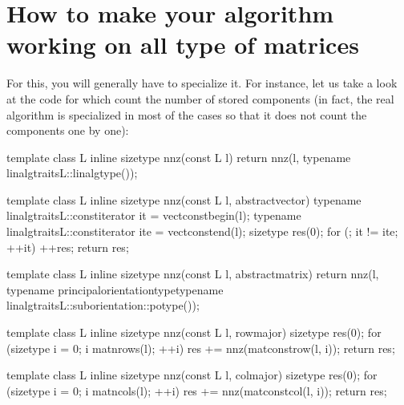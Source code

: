 \documentclass[a4paper,11pt,english]{sphinxmanual}
\begin{document}
\section{How to make your algorithm working on all type of matrices}
\label{\detokenize{gmm/inside:how-to-make-your-algorithm-working-on-all-type-of-matrices}}
For this, you will generally have to specialize it. For instance, let us take a look at the code for  which count the number of stored components (in fact, the real  algorithm is specialized in most of the cases so that it does not count the components one by one):

\begin{sphinxVerbatim}[commandchars=\\\{\}]
template \PYGZlt{}class L\PYGZgt{} inline size\PYGZus{}type nnz(const L\PYGZam{} l) \PYGZob{}
  return nnz(l, typename linalg\PYGZus{}traits\PYGZlt{}L\PYGZgt{}::linalg\PYGZus{}type());
\PYGZcb{}

template \PYGZlt{}class L\PYGZgt{} inline size\PYGZus{}type nnz(const L\PYGZam{} l, abstract\PYGZus{}vector) \PYGZob{}
  typename linalg\PYGZus{}traits\PYGZlt{}L\PYGZgt{}::const\PYGZus{}iterator it = vect\PYGZus{}const\PYGZus{}begin(l);
  typename linalg\PYGZus{}traits\PYGZlt{}L\PYGZgt{}::const\PYGZus{}iterator ite = vect\PYGZus{}const\PYGZus{}end(l);
  size\PYGZus{}type res(0);
  for (; it != ite; ++it) ++res;
  return res;
\PYGZcb{}

template \PYGZlt{}class L\PYGZgt{} inline size\PYGZus{}type nnz(const L\PYGZam{} l, abstract\PYGZus{}matrix) \PYGZob{}
  return nnz(l,  typename principal\PYGZus{}orientation\PYGZus{}type\PYGZlt{}typename
                 linalg\PYGZus{}traits\PYGZlt{}L\PYGZgt{}::sub\PYGZus{}orientation\PYGZgt{}::potype());
\PYGZcb{}

template \PYGZlt{}class L\PYGZgt{} inline size\PYGZus{}type nnz(const L\PYGZam{} l, row\PYGZus{}major) \PYGZob{}
  size\PYGZus{}type res(0);
  for (size\PYGZus{}type i = 0; i \PYGZlt{} mat\PYGZus{}nrows(l); ++i)
    res += nnz(mat\PYGZus{}const\PYGZus{}row(l, i));
  return res;
\PYGZcb{}

template \PYGZlt{}class L\PYGZgt{} inline size\PYGZus{}type nnz(const L\PYGZam{} l, col\PYGZus{}major) \PYGZob{}
  size\PYGZus{}type res(0);
  for (size\PYGZus{}type i = 0; i \PYGZlt{} mat\PYGZus{}ncols(l); ++i)
    res += nnz(mat\PYGZus{}const\PYGZus{}col(l, i));
  return res;
\PYGZcb{}
\end{sphinxVerbatim}
\end{document}
